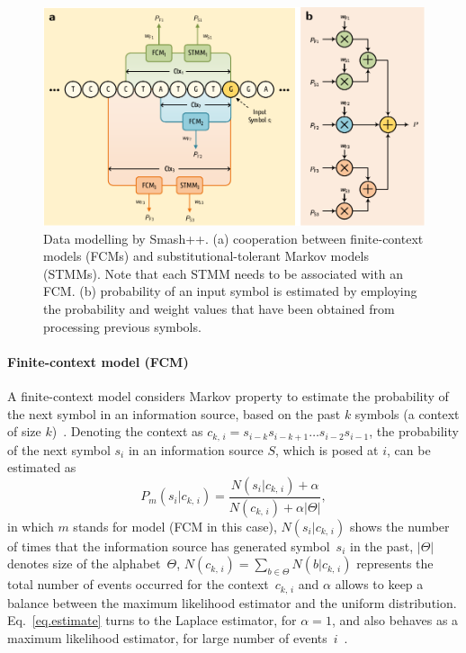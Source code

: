 \begin{figure}[!h]
  \centering
  \includegraphics[width=.85\linewidth]{data_model.pdf}
  \caption{Data modelling by Smash++. (a) cooperation between finite-context models (FCMs) and substitutional-tolerant Markov models (STMMs). Note that each STMM needs to be associated with an FCM. (b) probability of an input symbol is estimated by employing the probability and weight values that have been obtained from processing previous symbols.}
  \label{fig.model}
\end{figure}

\paragraph{Finite-context model (FCM)}
A finite-context model considers Markov property to estimate the probability of the next symbol in an information source, based on the past $k$ symbols (a context of size $k$)~\cite{sayood2017introduction,hosseini2019ac,pinho2013mfcompress}. Denoting the context as $c_{k,\,i} = s_{i-k} s_{i-k+1}\ldots s_{i-2} s_{i-1}$, the probability of the next symbol $s_i$ in an information source $S$, which is posed at $i$, can be estimated as
\begin{equation} \label{eq.estimate}
  P_m(s_i|c_{k,\,i}) = \frac{N(s_i|c_{k,\,i})+\alpha}{N(c_{k,\,i})+ \alpha|\Theta|},
\end{equation}
in which $m$ stands for model (FCM in this case), $N(s_i|c_{k,\,i})$ shows the number of times that the information source has generated symbol~$s_i$ in the past, $|\Theta|$ denotes size of the alphabet~$\Theta$, $N(c_{k,\,i}) = \sum_{b \in \Theta} N(b|c_{k,\,i})$ represents the total number of events occurred for the context~$c_{k,\,i}$ and $\alpha$ allows to keep a balance between the maximum likelihood estimator and the uniform distribution. Eq.~\ref{eq.estimate} turns to the Laplace estimator, for $\alpha=1$, and also behaves as a maximum likelihood estimator, for large number of events~$i$~\cite{pratas2015alignment}.

